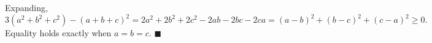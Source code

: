 Expanding,
\[3\left(a^2+b^2+c^2\right)-(a+b+c)^2=2a^2+2b^2+2c^2-2ab-2bc-2ca=(a-b)^2+(b-c)^2+(c-a)^2\ge0 .\]
Equality holds exactly when $a=b=c$. $\blacksquare$
